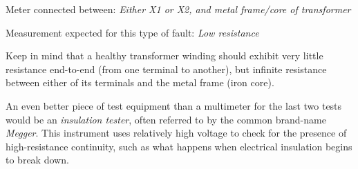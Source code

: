 \vskip 30pt

\noindent
{}

\vskip 5pt
\item{} Meter connected between: {\it Either X1 or X2, and metal frame/core of transformer}
\vskip 5pt
\item{} Measurement expected for this type of fault: {\it Low resistance}

\vskip 30pt

Keep in mind that a healthy transformer winding should exhibit very little resistance end-to-end (from one terminal to another), but infinite resistance between either of its terminals and the metal frame (iron core).

\vskip 10pt

An even better piece of test equipment than a multimeter for the last two tests would be an {\it insulation tester}, often referred to by the common brand-name {\it Megger}.  This instrument uses relatively high voltage to check for the presence of high-resistance continuity, such as what happens when electrical insulation begins to break down.




